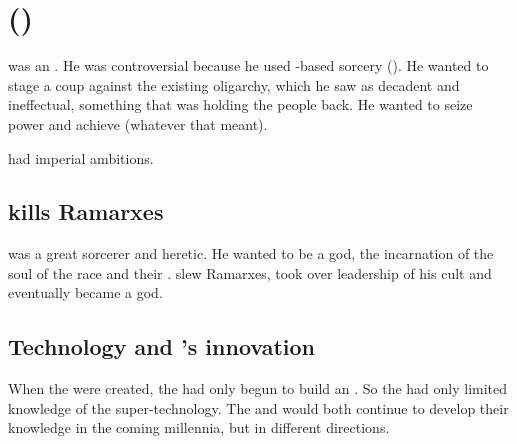 














\section{\Sethicus ()}
\Sethicus was an \ophidian.
He was controversial because he used \xs{}-based sorcery ().
He wanted to stage a coup against the existing \ophidian oligarchy, which he saw as decadent and ineffectual, something that was holding the \ophidian people back. 
He wanted to seize power and achieve  (whatever that meant). 

\Sethicus had imperial ambitions. 










\subsection{\Sethicus kills Ramarxes}
 was a great \caisith sorcerer and heretic.
He wanted to be a god, the incarnation of the soul of the \caisith race and their . 
\Sethicus slew Ramarxes, took over leadership of his cult and eventually became a god. 









\subsection{Technology and \Sethicus's innovation}
When the \dragons were created, the \ophidians had only begun to build an . 
So the \dragons had only limited knowledge of the \ophidian super-technology.
The \dragons and \ophidians would both continue to develop their knowledge in the coming millennia, but in different directions. 

